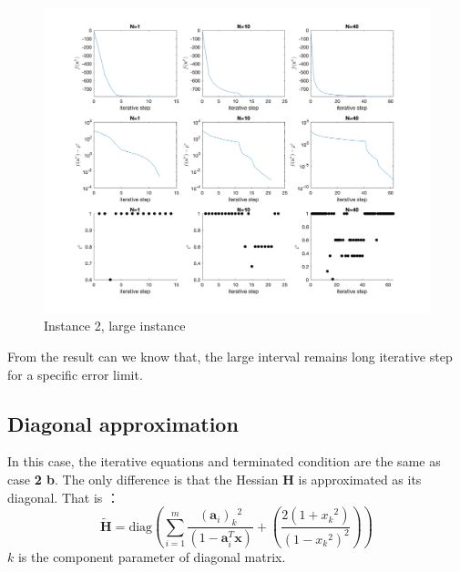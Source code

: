 \documentclass[]{article}
\begin{document}
\begin{figure}[H]
	\centering
	\includegraphics[width=350pt,keepaspectratio]{dampN1_large}
	\caption{Instance 2, large instance}
\end{figure}
\par From the result can we know that, the large interval remains long iterative step for a specific error limit.

\subsection{Diagonal approximation}
In this case, the iterative equations and terminated condition are the same as case \textbf{2 b}. The only difference is that the Hessian \textbf{H} is approximated as its diagonal. That is ：
$$\tilde{\textbf{H}} = \mathrm{diag}\left(\sum_{i=1}^{m}\frac{(\textbf{a}_i)_k\phantom{}^2}{(1-\textbf{a}_i^T\textbf{x})}+\left(\frac{2(1+x_k\phantom{}^2)}{(1-x_k\phantom{}^2)^2}\right)\right)$$ $k$ is the component parameter of diagonal matrix. 
\end{document}
